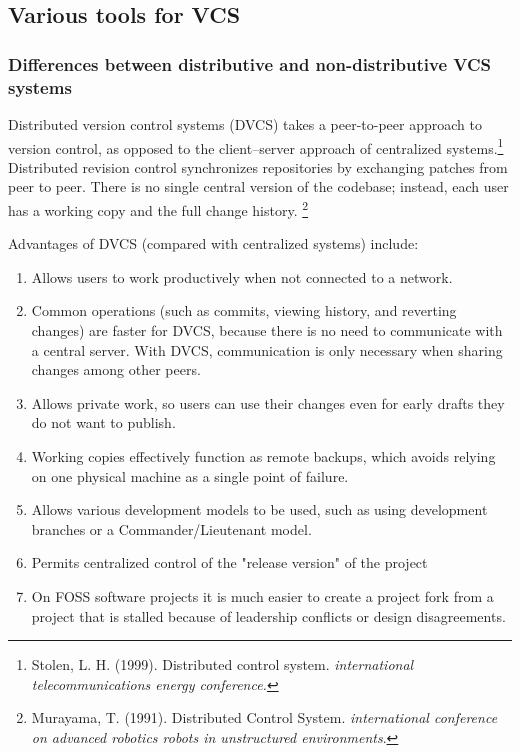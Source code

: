 \documentclass[a4paper]{report}
\begin{document}
\subsection{Various tools for VCS}
\subsubsection{Differences between distributive and non-distributive VCS systems}
\par
Distributed version control systems (DVCS) takes a peer-to-peer approach to version control, as opposed to the client–server approach of centralized systems.\footnote{Stolen, L. H. (1999). Distributed control system. \emph{international telecommunications energy conference.}} Distributed revision control synchronizes repositories by exchanging patches from peer to peer. There is no single central version of the codebase; instead, each user has a working copy and the full change history. \footnote{Murayama, T. (1991). Distributed Control System. \emph{international conference on advanced robotics robots in unstructured environments}.}
\par
Advantages of DVCS (compared with centralized systems) include:
\begin{enumerate}
  \item Allows users to work productively when not connected to a network.
  \item Common operations (such as commits, viewing history, and reverting changes) are faster for DVCS, because there is no need to communicate with a central server. With DVCS, communication is only necessary when sharing changes among other peers.
  \item Allows private work, so users can use their changes even for early drafts they do not want to publish.
  \item Working copies effectively function as remote backups, which avoids relying on one physical machine as a single point of failure.
  \item Allows various development models to be used, such as using development branches or a Commander/Lieutenant model.
  \item Permits centralized control of the "release version" of the project
  \item On FOSS software projects it is much easier to create a project fork from a project that is stalled because of leadership conflicts or design disagreements.
\end{enumerate}
\par
\end{document}
